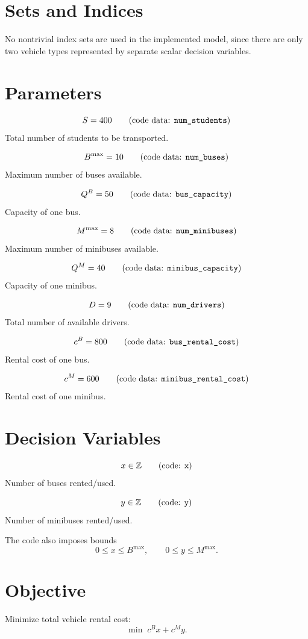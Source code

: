 \section*{Sets and Indices}

No nontrivial index sets are used in the implemented model, since there are only two vehicle types represented by separate scalar decision variables.

\section*{Parameters}

\[
S = 400
\qquad\text{(code data: \texttt{num\_students})}
\]
Total number of students to be transported.

\[
B^{\max} = 10
\qquad\text{(code data: \texttt{num\_buses})}
\]
Maximum number of buses available.

\[
Q^B = 50
\qquad\text{(code data: \texttt{bus\_capacity})}
\]
Capacity of one bus.

\[
M^{\max} = 8
\qquad\text{(code data: \texttt{num\_minibuses})}
\]
Maximum number of minibuses available.

\[
Q^M = 40
\qquad\text{(code data: \texttt{minibus\_capacity})}
\]
Capacity of one minibus.

\[
D = 9
\qquad\text{(code data: \texttt{num\_drivers})}
\]
Total number of available drivers.

\[
c^B = 800
\qquad\text{(code data: \texttt{bus\_rental\_cost})}
\]
Rental cost of one bus.

\[
c^M = 600
\qquad\text{(code data: \texttt{minibus\_rental\_cost})}
\]
Rental cost of one minibus.

\section*{Decision Variables}

\[
x \in \mathbb{Z}
\qquad\text{(code: \texttt{x})}
\]
Number of buses rented/used.

\[
y \in \mathbb{Z}
\qquad\text{(code: \texttt{y})}
\]
Number of minibuses rented/used.

The code also imposes bounds
\[
0 \le x \le B^{\max}, \qquad 0 \le y \le M^{\max}.
\]

\section*{Objective}

Minimize total vehicle rental cost:
\[
\min \; c^B x + c^M y .
\]

